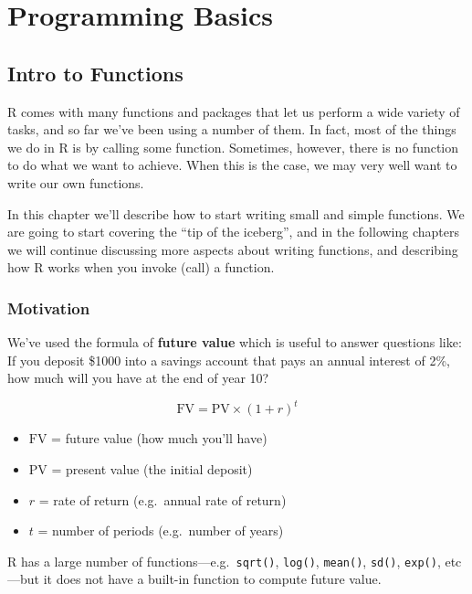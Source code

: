 \documentclass[
]{book}
\providecommand{\tightlist}{%
  \setlength{\itemsep}{0pt}\setlength{\parskip}{0pt}}
\begin{document}
\hypertarget{part-programming-basics}{%
\part{Programming Basics}\label{part-programming-basics}}

\hypertarget{functions1}{%
\chapter{Intro to Functions}\label{functions1}}

R comes with many functions and packages that let us perform a wide variety
of tasks, and so far we've been using a number of them. In fact, most of the
things we do in R is by calling some function. Sometimes, however, there is no
function to do what we want to achieve. When this is the case, we may very
well want to write our own functions.

In this chapter we'll describe how to start writing small and simple functions.
We are going to start covering the ``tip of the iceberg'', and in the following
chapters we will continue discussing more aspects about writing functions, and
describing how R works when you invoke (call) a function.

\hypertarget{motivation-1}{%
\section{Motivation}\label{motivation-1}}

We've used the formula of \textbf{future value} which is useful to answer questions
like: If you deposit \$1000 into a savings account that pays an annual interest
of 2\%, how much will you have at the end of year 10?

\[
\text{FV} = \text{PV} \times (1 + r)^t
\]

\begin{itemize}
\tightlist
\item
  \(\text{FV}\) = future value (how much you'll have)
\item
  \(\text{PV}\) = present value (the initial deposit)
\item
  \(r\) = rate of return (e.g.~annual rate of return)
\item
  \(t\) = number of periods (e.g.~number of years)
\end{itemize}

R has a large number of functions---e.g.~\texttt{sqrt()}, \texttt{log()}, \texttt{mean()},
\texttt{sd()}, \texttt{exp()}, etc---but it does not have a built-in function to compute
future value.
\end{document}
